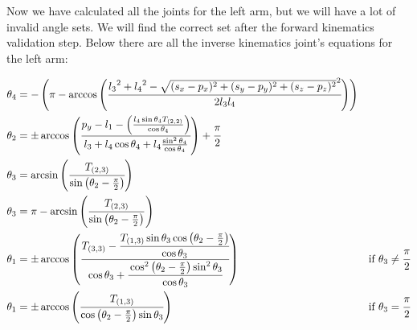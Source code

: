 Now we have calculated all the joints for the left arm, but we will have a lot of invalid angle sets. We will find the correct set after the forward kinematics validation step. Below there are all the inverse kinematics joint's equations for the left arm:
\begin{small}
\begin{align*}
\theta_4 &= -\left(\pi - \arccos\left(\cfrac{{l_3}^2 + {l_4}^2 - \sqrt{(s_x-p_x)^2 + (s_y-p_y)^2 + (s_z-p_z)^2}^2 }{2 l_3 l_4}\right)\right)\\
\theta_2 &= \pm\arccos\left(\cfrac{p_y - l_1 - \left(\frac{l_4\sin\theta_4 T_{(2,2)}}{\cos\theta_4}\right)}{l_3 +l_4\cos\theta_4 + l_4\frac{\sin^2\theta_4}{\cos\theta_4}}\right)+\cfrac{\pi}{2}\\
\theta_3 &= \arcsin\left(\cfrac{T_{(2,3)}}{\sin\left(\theta_2-\frac{\pi}{2}\right)}\right)\\
\theta_3 &= \pi - \arcsin\left(\frac{T_{(2,3)}}{\sin\left(\theta_2-\frac{\pi}{2}\right)}\right)\\
\theta_1 &= \pm\arccos\left(\cfrac{T_{(3,3)} - \cfrac{T_{(1,3)}\sin\theta_3\cos\left(\theta_2 - \frac{\pi}{2}\right)}{\cos\theta_3}}{\cos\theta_3 + \cfrac{\cos^2\left(\theta_2-\frac{\pi}{2}\right)\sin^2\theta_3}{\cos\theta_3}}\right) &\text{if } \theta_3 \neq \cfrac{\pi}{2}\\
\theta_1 &= \pm\arccos\left(\cfrac{T_{(1,3)}}{\cos\left(\theta_2 - \frac{\pi}{2}\right)\sin\theta_3}\right) &\text{if } \theta_3 = \cfrac{\pi}{2}
\end{align*}
\end{small}
